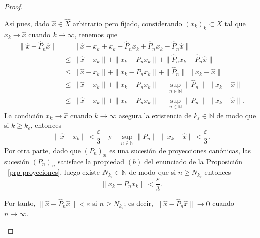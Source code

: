 \documentclass[
  spanish,
  letterpaper,
  DIV=11,
  numbers=noendperiod]{scrreprt}
\theoremstyle{definition}
\theoremstyle{remark}
\theoremstyle{definition}
\theoremstyle{exampstyle}
\theoremstyle{plain}
\theoremstyle{plain}
\theoremstyle{definition}
\theoremstyle{plain}
\theoremstyle{remark}
\begin{document}
\begin{proof}
\begin{enumerate}
  Así pues, dado \(\widehat{x}\in\widehat{X}\) arbitrario pero fijado,
  considerando \((x_k)_k\subset X\) tal que \(x_k\to \widehat{x}\)
  cuando \(k\to\infty\), tenemos que
  \begin{align*}   
      \|\widehat{x}-\widehat{P}_n\widehat{x}\|&=\|\widehat{x}-x_{k}+x_{k}-\widehat{P}_nx_{k}+\widehat{P}_nx_{k}-\widehat{P}_n\widehat{x}\|\\ 
      &\leq\|\widehat{x}-x_{k}\|+\|x_{k}-P_nx_{k}\|+\|\widehat{P}_nx_{k}-\widehat{P}_n\widehat{x}\|\\ 
      &\leq\|\widehat{x}-x_{k}\|+\|x_{k}-P_nx_{k}\|+\|\widehat{P}_n\|\,\|x_{k}-\widehat{x}\|\\
      &\leq\|\widehat{x}-x_{k}\|+\|x_{k}-P_nx_{k}\|+\sup_{n\in\mathbb{N}}\|\widehat{P}_n\|\,\|x_{k}-\widehat{x}\|\\
      &\leq \|\widehat{x}-x_{k}\|+\|x_{k}-P_nx_{k}\|+\sup_{n\in\mathbb{N}}\|P_n\|\,\|x_{k}-\widehat{x}\|.
  \end{align*}
  La condición \(x_k\to \widehat{x}\) cuando \(k\to\infty\) asegura la
  existencia de \(k_\varepsilon\in\mathbb{N}\) de modo que si
  \(k\geq k_\varepsilon\), entonces \[
  \|\widehat{x}-x_{k}\|<\dfrac{\varepsilon}{3}\quad\text{y}\quad \sup_{n\in\mathbb{N}}\|P_n\|\,\|x_{k}-\widehat{x}\|<\dfrac{\varepsilon}{3}.
  \] Por otra parte, dado que \((P_n)_n\) es una sucesión de
  proyecciones canónicas, las sucesión \((P_n)_n\) satisface la
  propiedad \((b)\) del enunciado de la Proposición
  ~\ref{prp-proyeciones}, luego existe
  \(N_{k_\varepsilon}\in\mathbb{N}\) de modo que si
  \(n\geq N_{k_\varepsilon}\) entonces \[
  \|x_{k}-P_nx_{k}\|<\dfrac{\varepsilon}{3}.
  \]

  Por tanto, \(\|\widehat{x}-\widehat{P}_n\widehat{x}\|<\varepsilon\) si
  \(n\geq N_{k_\varepsilon}\); es decir,
  \(\|\widehat{x}-\widehat{P}_n\widehat{x}\|\to 0\) cuando
  \(n\to\infty\).\qedhere
\end{enumerate}

\end{proof}
\end{document}
